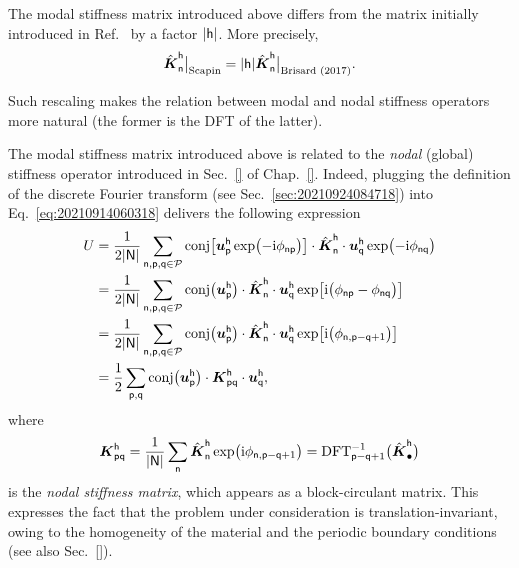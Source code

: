\begin{remark}
  The modal stiffness matrix introduced above differs from the matrix initially
  introduced in Ref.~\cite{bris2017} by a factor \(\lvert\mathsf{h}\rvert\). More
  precisely,
  \begin{equation}
    \hat{\boldsymbol K}_\mathsf{n}^\mathsf{h}
    \bigr\rvert_\text{Scapin}
    =\lvert\mathsf{h}\rvert\hat{\boldsymbol K}_\mathsf{n}^\mathsf{h}
    \bigr\rvert_\text{Brisard (2017)}.
  \end{equation}

  Such rescaling makes the relation between modal and nodal stiffness operators
  more natural (the former is the DFT of the latter).
\end{remark}

The modal stiffness matrix introduced above is related to the \emph{nodal}
(global) stiffness operator introduced in Sec.~\ref{} of Chap.~\ref{}. Indeed,
plugging the definition of the discrete Fourier transform (see
Sec.~\ref{sec:20210924084718}) into Eq. \eqref{eq:20210914060318} delivers the
following expression
\begin{equation}
  \begin{aligned}[b]
    U={}&\frac1{2\lvert\mathsf{N}\rvert}\sum_{\mathsf{n}, \mathsf{p}, \mathsf{q}\in\mathcal{P}}
    \operatorname{conj}\bigl[\boldsymbol u_\mathsf{p}^\mathsf{h}\exp\bigl(-\mathrm i\phi_\mathsf{np}\bigr)\bigr]
    \cdot\hat{\boldsymbol K}_\mathsf{n}^\mathsf{h}
    \cdot\boldsymbol u_\mathsf{q}^\mathsf{h}\exp\bigl(-\mathrm i\phi_\mathsf{nq}\bigr)\\
    ={}&\frac1{2\lvert\mathsf{N}\rvert}\sum_{\mathsf{n}, \mathsf{p}, \mathsf{q}\in\mathcal{P}}
    \operatorname{conj}\bigl(\boldsymbol u_\mathsf{p}^\mathsf{h}\bigr)
    \cdot\hat{\boldsymbol K}_\mathsf{n}^\mathsf{h}
    \cdot\boldsymbol u_\mathsf{q}^\mathsf{h}
    \exp\bigl[\mathrm i\bigl(\phi_\mathsf{np}-\phi_\mathsf{nq}\bigr)\bigr]\\
    ={}&\frac1{2\lvert\mathsf{N}\rvert}\sum_{\mathsf{n}, \mathsf{p}, \mathsf{q}\in\mathcal{P}}
    \operatorname{conj}\bigl(\boldsymbol u_\mathsf{p}^\mathsf{h}\bigr)
    \cdot\hat{\boldsymbol K}_\mathsf{n}^\mathsf{h}
    \cdot\boldsymbol u_\mathsf{q}^\mathsf{h}
    \exp\bigl[\mathrm i\bigl(\phi_{\mathsf{n}, \mathsf{p}-\mathsf{q}+1}\bigr)\bigr]\\
    ={}&\frac12\sum_{\mathsf{p},\mathsf{q}}
    \operatorname{conj}\bigl(\boldsymbol u_\mathsf{p}^\mathsf{h}\bigr)\cdot\boldsymbol K_\mathsf{pq}^\mathsf{h}
    \cdot\boldsymbol u_\mathsf{q}^\mathsf{h},
  \end{aligned}
\end{equation}
where
\begin{equation}
  \boldsymbol{K}_{\mathsf{pq}}^\mathsf{h}
  =\frac1{\lvert\mathsf{N}\rvert}\sum_{\mathsf{n}}
  \hat{\boldsymbol K}_\mathsf{n}^\mathsf{h}
  \exp\bigl(\mathrm i\phi_{\mathsf{n},\mathsf{p}-\mathsf{q}+1}\bigr)
  =\operatorname{DFT}_{\mathsf{p}-\mathsf{q}+1}^{-1}\bigl(\hat{\boldsymbol K}_\mathsf{\bullet}^\mathsf{h}\bigr)
\end{equation}
is the \emph{nodal stiffness matrix}, which appears as a block-circulant
matrix. This expresses the fact that the problem under consideration is
translation-invariant, owing to the homogeneity of the material and the periodic
boundary conditions (see also Sec.~\ref{}).

